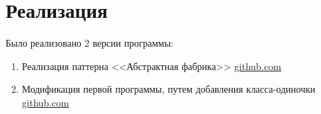 \documentclass[PI,LAB]{HSEUniversity}
\begin{document}
\section{Реализация}
Было реализовано 2 версии программы:
\begin{enumerate}
  \item Реализация паттерна <<Абстрактная фабрика>> \href{https://github.com/rovany706/design-patterns/tree/Abstract-factory/AbstractFactoryAndSingleton/src/ru/ryazanov/HSE}{github.com}
  \item Модификация первой программы, путем добавления класса-одиночки  \href{https://github.com/rovany706/design-patterns/tree/master/AbstractFactoryAndSingleton/src/ru/ryazanov/HSE}{github.com}
\end{enumerate}
\end{document}
